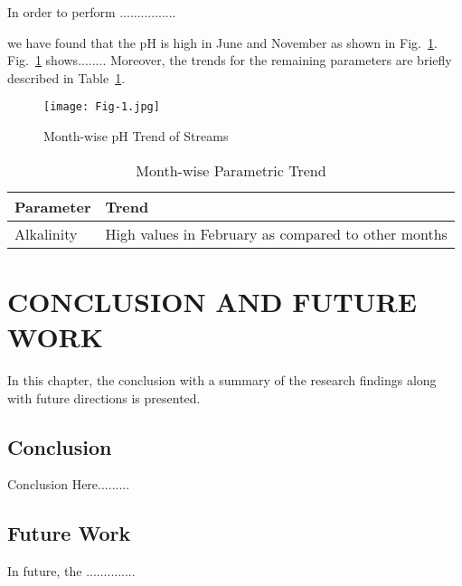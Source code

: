 \documentclass[12pt,a4paper,oneside]{book} %
\begin{document}
In order to perform ................

we have found that the pH is high in June and November as shown in Fig.~\ref{fig:Fig4}.  Fig.~\ref{fig:Fig4} shows........ Moreover, the trends for the remaining parameters are briefly described in Table~\ref{table:table13}.

\begin{figure}[!t]
  \centering
  \texttt{[image: Fig-1.jpg]}
  \caption{Month-wise pH Trend of Streams}
  \label{fig:Fig4}
\end{figure}


\begin{table}[!t]
  \begin{center}\scriptsize
      \renewcommand{\arraystretch}{1.3}
      \caption{Month-wise Parametric Trend}
      \label{table:table13}
      \begin{tabular}{ll}
          \hline\hline
              {\bfseries Parameter} & {\bfseries Trend} \\
              \hline                                      %
              Alkalinity & High values in February as compared to other months\\
              \hline                          %
      \end{tabular}
  \end{center}
\end{table}

\chapter{CONCLUSION AND FUTURE WORK}\label{c-conclusion}

In this chapter, the conclusion with a summary of the research findings along with future directions is presented.

\section{Conclusion}
Conclusion Here.........

\section{Future Work}
In future, the ..............
\end{document}
